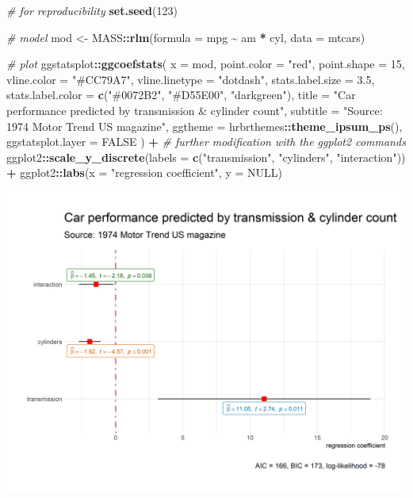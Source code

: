 \documentclass[
]{article}
\newenvironment{Shaded}{\begin{snugshade}}{\end{snugshade}}
\newcommand{\CommentTok}[1]{\textcolor[rgb]{0.56,0.35,0.01}{\textit{#1}}}
\newcommand{\DataTypeTok}[1]{\textcolor[rgb]{0.13,0.29,0.53}{#1}}
\newcommand{\DecValTok}[1]{\textcolor[rgb]{0.00,0.00,0.81}{#1}}
\newcommand{\FloatTok}[1]{\textcolor[rgb]{0.00,0.00,0.81}{#1}}
\newcommand{\KeywordTok}[1]{\textcolor[rgb]{0.13,0.29,0.53}{\textbf{#1}}}
\newcommand{\NormalTok}[1]{#1}
\newcommand{\OperatorTok}[1]{\textcolor[rgb]{0.81,0.36,0.00}{\textbf{#1}}}
\newcommand{\OtherTok}[1]{\textcolor[rgb]{0.56,0.35,0.01}{#1}}
\newcommand{\StringTok}[1]{\textcolor[rgb]{0.31,0.60,0.02}{#1}}
\begin{document}
\begin{Shaded}
\begin{Highlighting}[]
\CommentTok{\# for reproducibility}
\KeywordTok{set.seed}\NormalTok{(}\DecValTok{123}\NormalTok{)}

\CommentTok{\# model}
\NormalTok{mod <{-}}\StringTok{ }\NormalTok{MASS}\OperatorTok{::}\KeywordTok{rlm}\NormalTok{(}\DataTypeTok{formula =}\NormalTok{ mpg }\OperatorTok{\textasciitilde{}}\StringTok{ }\NormalTok{am }\OperatorTok{*}\StringTok{ }\NormalTok{cyl, }\DataTypeTok{data =}\NormalTok{ mtcars)}

\CommentTok{\# plot}
\NormalTok{ggstatsplot}\OperatorTok{::}\KeywordTok{ggcoefstats}\NormalTok{(}
  \DataTypeTok{x =}\NormalTok{ mod,}
  \DataTypeTok{point.color =} \StringTok{"red"}\NormalTok{,}
  \DataTypeTok{point.shape =} \DecValTok{15}\NormalTok{,}
  \DataTypeTok{vline.color =} \StringTok{"\#CC79A7"}\NormalTok{,}
  \DataTypeTok{vline.linetype =} \StringTok{"dotdash"}\NormalTok{,}
  \DataTypeTok{stats.label.size =} \FloatTok{3.5}\NormalTok{,}
  \DataTypeTok{stats.label.color =} \KeywordTok{c}\NormalTok{(}\StringTok{"\#0072B2"}\NormalTok{, }\StringTok{"\#D55E00"}\NormalTok{, }\StringTok{"darkgreen"}\NormalTok{),}
  \DataTypeTok{title =} \StringTok{"Car performance predicted by transmission \& cylinder count"}\NormalTok{,}
  \DataTypeTok{subtitle =} \StringTok{"Source: 1974 Motor Trend US magazine"}\NormalTok{,}
  \DataTypeTok{ggtheme =}\NormalTok{ hrbrthemes}\OperatorTok{::}\KeywordTok{theme\_ipsum\_ps}\NormalTok{(),}
  \DataTypeTok{ggstatsplot.layer =} \OtherTok{FALSE}
\NormalTok{) }\OperatorTok{+}\StringTok{ }\CommentTok{\# further modification with the ggplot2 commands}
\StringTok{  }\NormalTok{ggplot2}\OperatorTok{::}\KeywordTok{scale\_y\_discrete}\NormalTok{(}\DataTypeTok{labels =} \KeywordTok{c}\NormalTok{(}\StringTok{"transmission"}\NormalTok{, }\StringTok{"cylinders"}\NormalTok{, }\StringTok{"interaction"}\NormalTok{)) }\OperatorTok{+}
\StringTok{  }\NormalTok{ggplot2}\OperatorTok{::}\KeywordTok{labs}\NormalTok{(}\DataTypeTok{x =} \StringTok{"regression coefficient"}\NormalTok{, }\DataTypeTok{y =} \OtherTok{NULL}\NormalTok{)}
\end{Highlighting}
\end{Shaded}

\includegraphics[width=1\linewidth]{./figures/paper-ggcoefstats2-1}
\end{document}
